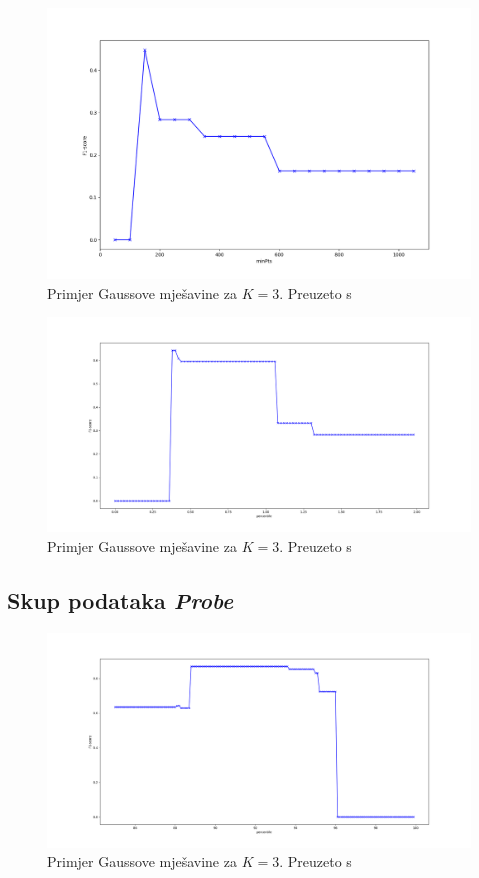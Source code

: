 \documentclass[utf8, diplomski, numeric]{fer}
\begin{document}
\begin{figure}[htb]
\includegraphics[width=1\textwidth]{images/u2r-dbscan-f1.png}
\centering
\caption{Primjer Gaussove mješavine za $K = 3$. Preuzeto s  \cite{GaussianMixtureExplained}}
\label{fig:u2r-dbscan}
\end{figure}

\begin{figure}[htb]
\includegraphics[width=1\textwidth]{images/u2r-gauss-f1.png}
\centering
\caption{Primjer Gaussove mješavine za $K = 3$. Preuzeto s  \cite{GaussianMixtureExplained}}
\label{fig:u2r-gauss}
\end{figure}

\subsection{Skup podataka \textit{Probe}}

\begin{figure}[htb]
\includegraphics[width=1\textwidth]{images/probe-kmeans-f1.png}
\centering
\caption{Primjer Gaussove mješavine za $K = 3$. Preuzeto s  \cite{GaussianMixtureExplained}}
\label{fig:probe-kmeans}
\end{figure}
\end{document}
